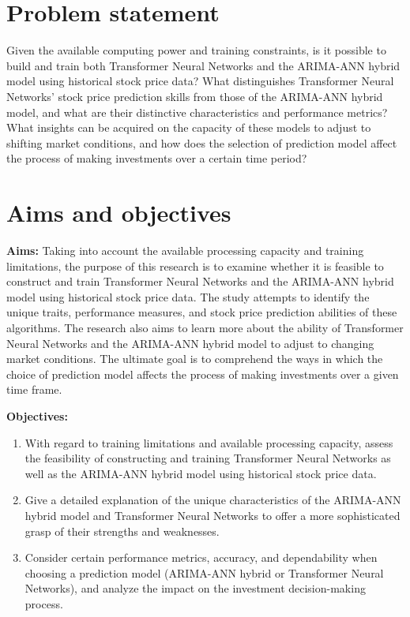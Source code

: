 \section{Problem statement}
\label{sec:intro_prob_art}
Given the available computing power and training constraints, is it possible to build and train 
both Transformer Neural Networks and the ARIMA-ANN hybrid model using historical stock price 
data? What distinguishes Transformer Neural Networks' stock price prediction skills from those 
of the ARIMA-ANN hybrid model, and what are their distinctive characteristics and performance 
metrics? What insights can be acquired on the capacity of these models to adjust to shifting 
market conditions, and how does the selection of prediction model affect the process of making 
investments over a certain time period?

\section{Aims and objectives}
\label{sec:intro_aims_obj}


\textbf{Aims:} 
Taking into account the available processing capacity and training limitations, the purpose of this research is to examine whether it is feasible to construct and train Transformer Neural Networks and the ARIMA-ANN hybrid model using historical stock price data. 
The study attempts to identify the unique traits, performance measures, and stock price prediction abilities of these algorithms. The research also aims to learn more about the ability of Transformer Neural Networks and the ARIMA-ANN hybrid model to adjust to changing market conditions.
The ultimate goal is to comprehend the ways in which the choice of prediction model affects the process of making investments over a given time frame.


\textbf{Objectives:} 
    \label{sec:first objective}
    \begin{enumerate}
        \item With regard to training limitations and available processing capacity, assess the feasibility of constructing and training Transformer Neural Networks as well as the ARIMA-ANN hybrid model using historical stock price data.
        \item Give a detailed explanation of the unique characteristics of the ARIMA-ANN hybrid model and Transformer Neural Networks to offer a more sophisticated grasp of their strengths and weaknesses.
        \item Consider certain performance metrics, accuracy, and dependability when choosing a prediction model (ARIMA-ANN hybrid or Transformer Neural Networks), and analyze the impact on the investment decision-making process.
    \end{enumerate}





